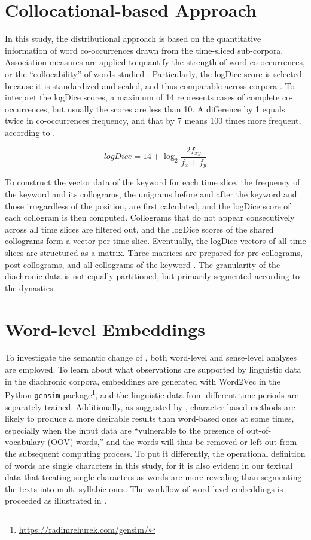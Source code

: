 \section{Collocational-based Approach}
In this study, the distributional approach is based on the quantitative information of word co-occurrences drawn from the time-sliced sub-corpora. Association measures are applied to quantify the strength of word co-occurrences, or the ``collocability'' of words studied \parencite{gablasova2017collocations}. Particularly, the logDice score is selected because it is standardized and scaled, and thus comparable across corpora \parencite{rychly2008lexicographer,gablasova2017collocations}. To interpret the logDice scores, a maximum of 14 represents cases of complete co-occurrences, but usually the scores are less than 10. A difference by 1 equals twice in co-occurrences frequency, and that by 7 means 100 times more frequent, according to .

\begin{equation}
  logDice = 14 + \log_{2}{\frac{2f_{xy}}{f_x + f_y}}
  \label{equ:logDice}
\end{equation}

To construct the vector data of the keyword \jia for each time slice, the frequency of the keyword and its collograms, the unigrams before and after the keyword and those irregardless of the position, are first calculated, and the logDice score of each collogram is then computed. Collograms that do not appear consecutively across all time slices are filtered out, and the logDice scores of the shared collograms form a vector per time slice. Eventually, the logDice vectors of all time slices are structured as a matrix. Three matrices are prepared for pre-collograms, post-collograms, and all collograms of the keyword \jia\rspace. The granularity of the diachronic data is not equally partitioned, but primarily segmented according to the dynasties.

\section{Word-level Embeddings}
To investigate the semantic change of \jia\rspace, both word-level and sense-level analyses are employed. To learn about what observations are supported by linguistic data in the diachronic corpora, embeddings are generated with Word2Vec in the Python \texttt{gensim} package\footnote{\url{https://radimrehurek.com/gensim/}}, and the linguistic data from different time periods are separately trained. Additionally, as suggested by \textcite{li2019word}, character-based methods are likely to produce a more desirable results than word-based ones at some times, especially when the input data are ``vulnerable to the presence of out-of-vocabulary (OOV) words,'' and the words will thus be removed or left out from the subsequent computing process. To put it differently, the operational definition of words are single characters in this study, for it is also evident in our textual data that treating single characters as words are more revealing than segmenting the texts into multi-syllabic ones. The workflow of word-level embeddings is proceeded as illustrated in .

